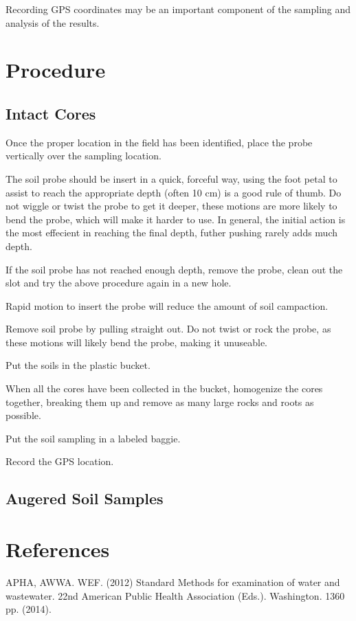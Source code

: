 \documentclass[12pt]{../SOP2}\usepackage[]{graphicx}\usepackage[]{xcolor}
\begin{document}
\NP Recording GPS coordinates may be an important component of the sampling and analysis of the results. 

\section{Procedure}

\subsection*{Intact Cores}

\NP Once the proper location in the field has been identified, place the probe vertically over the sampling location.

\NP The soil probe should be insert in a quick, forceful way, using the foot petal to assist to reach the appropriate depth (often 10 cm) is a good rule of thumb. Do not wiggle or twist the probe to get it deeper, these motions are more likely to bend the probe, which will make it harder to use. In general, the initial action is the most effecient in reaching the final depth, futher pushing rarely adds much depth. 

\NP If the soil probe has not reached enough depth, remove the probe, clean out the slot and try the above procedure again in a new hole.

\NP Rapid motion to insert the probe will reduce the amount of soil campaction. 

\NP Remove soil probe by pulling straight out. Do not twist or rock the probe, as these motions will likely bend the probe, making it unuseable. 

\NP Put the soils in the plastic bucket.

\NP When all the cores have been collected in the bucket, homogenize the cores together, breaking them up and remove as many large rocks and roots as possible. 

\NP Put the soil sampling in a labeled baggie.

\NP Record the GPS location. 

\subsection*{Augered Soil Samples}

\section{References}

\NP APHA, AWWA. WEF. (2012) Standard Methods for examination of water and wastewater. 22nd American Public Health Association (Eds.). Washington. 1360 pp. (2014).
\end{document}

